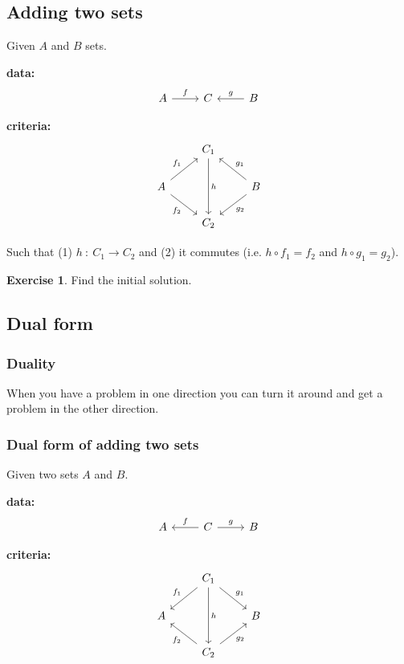 \documentclass[a4paper, 12pt]{article}
\theoremstyle{definition}
\newtheorem{exercise}{Exercise}
\begin{document}
\subsection{Adding two sets}

Given $A$ and $B$ sets.

\textbf{data:}
$$
\begin{tikzcd}
    A \arrow[r, "f"] & C & B \arrow[l, swap, "g"]
\end{tikzcd}
$$

\textbf{criteria:}
$$
\begin{tikzcd}
    {} & C_1 \arrow[dd, "h"] & {} \\
    A \arrow[ru, "f_1"] \arrow[rd, swap, "f_2"]
    & {}
    &
    B \arrow[lu, swap, "g_1"] \arrow[ld, "g_2"]
    \\
    {} & C_2 & {}
\end{tikzcd}
$$

Such that (1) $h\ :\ C_1 \rightarrow C_2$ and (2) it commutes (i.e. $h \circ f_1 = f_2$
and $h \circ g_1 = g_2$).

\begin{exercise}
    Find the initial solution.
\end{exercise}

\subsection{Dual form}

\subsubsection*{Duality}
When you have a problem in one direction you can turn it around and get a
problem in the other direction.

\subsubsection*{Dual form of adding two sets}

Given two sets $A$ and $B$.

\textbf{data:}
$$
\begin{tikzcd}
    A & C \arrow[l, swap, "f"] \arrow[r, "g"] & B
\end{tikzcd}
$$

\textbf{criteria:}
$$
\begin{tikzcd}
    {} & C_1 \arrow[dd, "h"] \arrow[ld, swap, "f_1"] \arrow[rd, "g_1"] & {} \\
    A & {} & B \\
    {} & C_2 \arrow[lu, "f_2"] \arrow[ru, swap, "g_2"] & {}
\end{tikzcd}
$$
\end{document}
